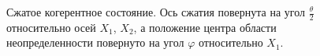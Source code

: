 \begin{figure}
\centering



\caption{Сжатое когерентное состояние. Ось сжатия повернута на угол $\frac{\theta}{2}$
относительно осей $X_1$, $X_2$, а положение центра области
неопределенности повернуто на угол $\varphi$ относительно
$X_1$.}
\label{figPart3Squeezed_9}
\end{figure}
